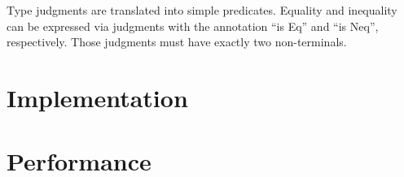 Type judgments are translated into simple predicates. Equality and
inequality can be expressed via judgments with the annotation ``is
Eq'' and ``is Neq'', respectively. Those judgments must have exactly
two non-terminals.
\section{Implementation}
\section{Performance}
